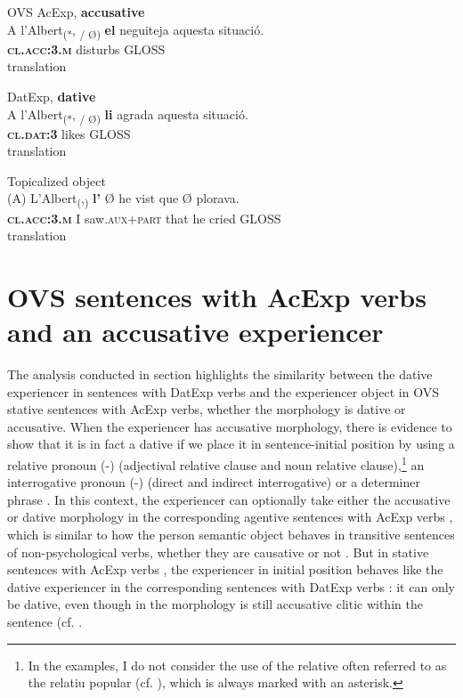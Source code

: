 \documentclass[output=paper,modfonts,nonflat,newtxmath]{langsci/langscibook}
\begin{document}
 \ex OVS AcExp, \textbf{accusative}\label{ex:royo:13b}\\
 \gll A l’Albert\textsubscript{(*}, \textsubscript{/ Ø)} \textbf{el} neguiteja aquesta situació.\\
  \textbf{\textsc{cl.acc:3.m}} disturbs GLOSS\\
 \glt translation
 
 \ex DatExp, \textbf{dative}\label{ex:royo:13c}\\
 \gll A l’Albert\textsubscript{(*}, \textsubscript{/ Ø)} \textbf{li} agrada aquesta situació.\\
  \textbf{\textsc{cl.dat:3}} likes GLOSS\\
 \glt translation
 
 \ex Topicalized object\label{ex:royo:13d}\\
 \gll (A) L’Albert\textsubscript{(},\textsubscript{)} \textbf{l’} Ø he vist que Ø plorava.\\
 \textbf{\textsc{cl.acc:3.m}} I saw.\textsc{aux+part} that he cried GLOSS\\
 \glt translation
 \z
 \z


\section{OVS sentences with AcExp verbs and an accusative experiencer}%

The analysis conducted in section  highlights the similarity between the dative experiencer in sentences with DatExp verbs and the experiencer object in OVS stative sentences with AcExp verbs, whether the morphology is dative or accusative. When the experiencer has accusative morphology, there is evidence to show that it is in fact a dative if we place it in sentence-initial position by using a relative pronoun (-) (adjectival relative clause and noun relative clause),\footnote{In the examples, I do not consider the use of the relative often referred to as the {relatiu} {popular} (cf. \citealt[154-155]{Ginebra2005}), which is always marked with an asterisk.} an interrogative pronoun (-) (direct and indirect interrogative) or a determiner phrase . In this context, the experiencer can optionally take either the accusative or dative morphology in the corresponding agentive sentences with AcExp verbs , which is similar to how the person semantic object behaves in transitive sentences of non-psychological verbs, whether they are causative or not . But in stative sentences with AcExp verbs , the experiencer in initial position behaves like the dative experiencer in the corresponding sentences with DatExp verbs : it can only be dative, even though in  the morphology is still accusative clitic within the sentence (cf. \citealt[Section 4.3.4]{Royo2017}.
\end{document}
